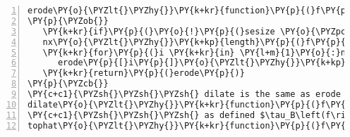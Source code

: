 \begin{Verbatim}[commandchars=\\\{\},codes={\catcode`\$=3\catcode`\^=7\catcode`\_=8},gobble=0,numbers=left,fontfamily=fvm,fontshape=n,fontsize=\footnotesize,tabsize=2]
erode\PY{o}{\PYZlt{}\PYZhy{}}\PY{k+kr}{function}\PY{p}{(}f\PY{p}{,}sesize\PY{p}{)} \PY{c+c1}{\PYZsh{}f are the intensities}
\PY{p}{\PYZob{}} 
   \PY{k+kr}{if}\PY{p}{(}\PY{o}{!}\PY{p}{(}sesize \PY{o}{\PYZpc{}\PYZpc{}} \PY{l+m}{2}\PY{p}{)}\PY{p}{)} \PY{k+kr}{return}\PY{p}{(}\PY{k+kc}{NULL}\PY{p}{)} \PY{c+c1}{\PYZsh{}SE must be of odd length}
   nx\PY{o}{\PYZlt{}\PYZhy{}}\PY{k+kp}{length}\PY{p}{(}f\PY{p}{)}\PY{p}{;} erode\PY{o}{\PYZlt{}\PYZhy{}}\PY{k+kp}{rep}\PY{p}{(}\PY{l+m}{0}\PY{p}{,}nx\PY{p}{)}\PY{p}{;} halfse\PY{o}{\PYZlt{}\PYZhy{}}\PY{p}{(}sesize\PY{l+m}{\PYZhy{}1}\PY{p}{)}\PY{o}{/}\PY{l+m}{2}\PY{p}{;}
   \PY{k+kr}{for}\PY{p}{(}i \PY{k+kr}{in} \PY{l+m}{1}\PY{o}{:}nx\PY{p}{)} \PY{c+c1}{\PYZsh{}for each m/z point across the spectrum}
      erode\PY{p}{[}i\PY{p}{]}\PY{o}{\PYZlt{}\PYZhy{}}\PY{k+kp}{min}\PY{p}{(}f\PY{p}{[}\PY{k+kp}{max}\PY{p}{(}\PY{l+m}{1}\PY{p}{,}i\PY{o}{\PYZhy{}}halfse\PY{p}{)}\PY{o}{:}\PY{k+kp}{min}\PY{p}{(}nx\PY{p}{,}i\PY{o}{+}halfse\PY{p}{)}\PY{p}{]}\PY{p}{)}
   \PY{k+kr}{return}\PY{p}{(}erode\PY{p}{)}
\PY{p}{\PYZcb{}} 
\PY{c+c1}{\PYZsh{}\PYZsh{}\PYZsh{} dilate is the same as erode except use max instead of min ...OR...}
dilate\PY{o}{\PYZlt{}\PYZhy{}}\PY{k+kr}{function}\PY{p}{(}f\PY{p}{,}sesize\PY{p}{)} \PY{k+kr}{return}\PY{p}{(}\PY{o}{\PYZhy{}}erode\PY{p}{(}\PY{o}{\PYZhy{}}f\PY{p}{,}sesize\PY{p}{)}\PY{p}{)}
\PY{c+c1}{\PYZsh{}\PYZsh{}\PYZsh{} as defined $\tau_B\left(f\right)=f-\left(f\ominus{B}\right)\oplus{B}$}
tophat\PY{o}{\PYZlt{}\PYZhy{}}\PY{k+kr}{function}\PY{p}{(}f\PY{p}{,}sesize\PY{p}{)} \PY{k+kr}{return}\PY{p}{(}f\PY{o}{\PYZhy{}}dilate\PY{p}{(}erode\PY{p}{(}f\PY{p}{,}sesize\PY{p}{)}\PY{p}{,}sesize\PY{p}{)}\PY{p}{)}
\end{Verbatim}
